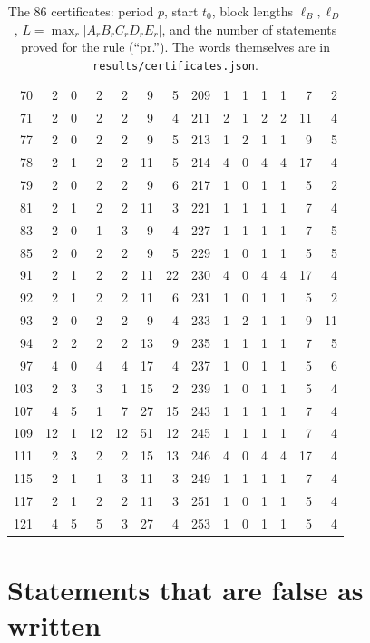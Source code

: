 \documentclass[11pt]{article}
\theoremstyle{definition}
\theoremstyle{remark}
\begin{document}
\begin{table}[ht]
\begin{tabular}{rrrrrrr|rrrrrrr}
70 & 2 & 0 & 2 & 2 & 9 & 5 & 209 & 1 & 1 & 1 & 1 & 7 & 2 \\
71 & 2 & 0 & 2 & 2 & 9 & 4 & 211 & 2 & 1 & 2 & 2 & 11 & 4 \\
77 & 2 & 0 & 2 & 2 & 9 & 5 & 213 & 1 & 2 & 1 & 1 & 9 & 5 \\
78 & 2 & 1 & 2 & 2 & 11 & 5 & 214 & 4 & 0 & 4 & 4 & 17 & 4 \\
79 & 2 & 0 & 2 & 2 & 9 & 6 & 217 & 1 & 0 & 1 & 1 & 5 & 2 \\
81 & 2 & 1 & 2 & 2 & 11 & 3 & 221 & 1 & 1 & 1 & 1 & 7 & 4 \\
83 & 2 & 0 & 1 & 3 & 9 & 4 & 227 & 1 & 1 & 1 & 1 & 7 & 5 \\
85 & 2 & 0 & 2 & 2 & 9 & 5 & 229 & 1 & 0 & 1 & 1 & 5 & 5 \\
91 & 2 & 1 & 2 & 2 & 11 & 22 & 230 & 4 & 0 & 4 & 4 & 17 & 4 \\
92 & 2 & 1 & 2 & 2 & 11 & 6 & 231 & 1 & 0 & 1 & 1 & 5 & 2 \\
93 & 2 & 0 & 2 & 2 & 9 & 4 & 233 & 1 & 2 & 1 & 1 & 9 & 11 \\
94 & 2 & 2 & 2 & 2 & 13 & 9 & 235 & 1 & 1 & 1 & 1 & 7 & 5 \\
97 & 4 & 0 & 4 & 4 & 17 & 4 & 237 & 1 & 0 & 1 & 1 & 5 & 6 \\
103 & 2 & 3 & 3 & 1 & 15 & 2 & 239 & 1 & 0 & 1 & 1 & 5 & 4 \\
107 & 4 & 5 & 1 & 7 & 27 & 15 & 243 & 1 & 1 & 1 & 1 & 7 & 4 \\
109 & 12 & 1 & 12 & 12 & 51 & 12 & 245 & 1 & 1 & 1 & 1 & 7 & 4 \\
111 & 2 & 3 & 2 & 2 & 15 & 13 & 246 & 4 & 0 & 4 & 4 & 17 & 4 \\
115 & 2 & 1 & 1 & 3 & 11 & 3 & 249 & 1 & 1 & 1 & 1 & 7 & 4 \\
117 & 2 & 1 & 2 & 2 & 11 & 3 & 251 & 1 & 0 & 1 & 1 & 5 & 4 \\
121 & 4 & 5 & 5 & 3 & 27 & 4 & 253 & 1 & 0 & 1 & 1 & 5 & 4 \\
\bottomrule\end{tabular}
\caption{The 86 certificates: period $p$, start $t_0$, block lengths $\ell_B,\ell_D$, $L=\max_r|A_rB_rC_rD_rE_r|$, and the number of statements proved for the rule (``pr.''). The words themselves are in \texttt{results/certificates.json}.}\label{tab:cert}
\end{table}

\section{Statements that are false as written}\label{sec:false}
\end{document}

